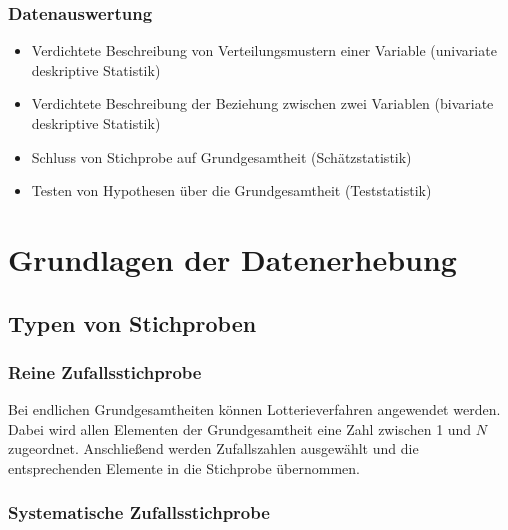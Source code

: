 \documentclass[
  11pt,
  ngerman,
  a4paper,
]{report}
\providecommand{\tightlist}{%
  \setlength{\itemsep}{0pt}\setlength{\parskip}{0pt}}
\begin{document}
\hypertarget{datenauswertung}{%
\subsubsection{Datenauswertung}\label{datenauswertung}}

\begin{itemize}
\tightlist
\item
  Verdichtete Beschreibung von Verteilungsmustern einer Variable (univariate deskriptive Statistik)
\item
  Verdichtete Beschreibung der Beziehung zwischen zwei Variablen (bivariate deskriptive Statistik)
\item
  Schluss von Stichprobe auf Grundgesamtheit (Schätzstatistik)
\item
  Testen von Hypothesen über die Grundgesamtheit (Teststatistik)
\end{itemize}

\hypertarget{grundlagen-der-datenerhebung}{%
\section{Grundlagen der Datenerhebung}\label{grundlagen-der-datenerhebung}}

\nopagebreak

\hypertarget{typen-von-stichproben}{%
\subsection{Typen von Stichproben}\label{typen-von-stichproben}}

\nopagebreak

\hypertarget{reine-zufallsstichprobe}{%
\subsubsection{Reine Zufallsstichprobe}\label{reine-zufallsstichprobe}}

Bei endlichen Grundgesamtheiten können Lotterieverfahren angewendet werden. Dabei wird allen Elementen der Grundgesamtheit eine Zahl zwischen 1 und \(N\) zugeordnet. Anschließend werden Zufallszahlen ausgewählt und die entsprechenden Elemente in die Stichprobe übernommen.

\hypertarget{systematische-zufallsstichprobe}{%
\subsubsection{Systematische Zufallsstichprobe}\label{systematische-zufallsstichprobe}}
\end{document}
